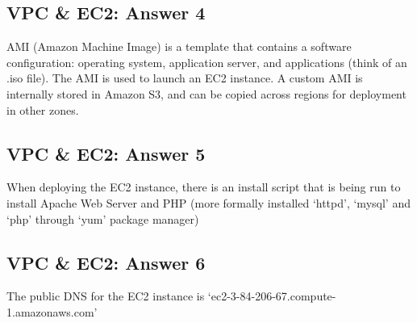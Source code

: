 \documentclass[
  11pt, %
]{assignment}
\begin{document}
\subsection*{VPC \& EC2: Answer 4}

AMI (Amazon Machine Image) is a template that contains a software configuration: operating system, application server, and applications (think of an \@.iso file). The AMI is used to launch an EC2 instance. A custom AMI is internally stored in Amazon S3, and can be copied across regions for deployment in other zones.

\subsection*{VPC \& EC2: Answer 5}

When deploying the EC2 instance, there is an install script that is being run to install Apache Web Server and PHP (more formally installed `httpd', `mysql' and `php' through `yum' package manager)

\subsection*{VPC \& EC2: Answer 6}

The public DNS for the EC2 instance is `ec2-3-84-206-67.compute-1.amazonaws.com'

\end{document}

